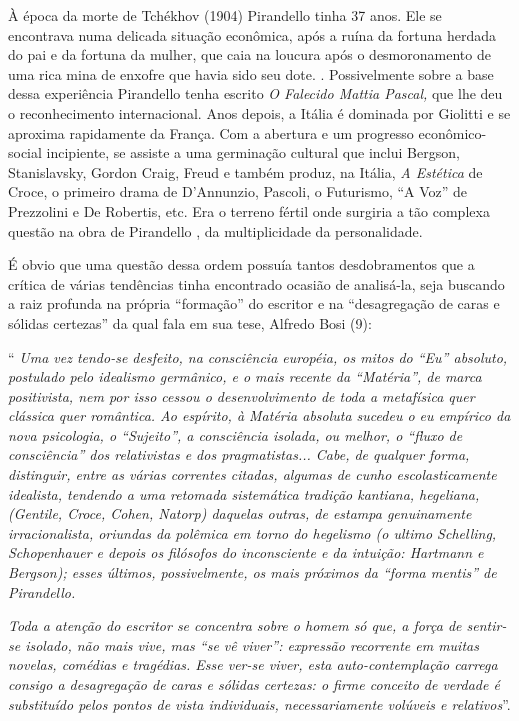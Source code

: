 À época da morte de Tchékhov (1904) Pirandello tinha 37 anos. Ele se
encontrava numa delicada situação econômica, após a ruína da fortuna
herdada do pai e da fortuna da mulher, que caia na loucura após o
desmoronamento de uma rica mina de enxofre que havia sido seu dote. .
Possivelmente sobre a base dessa experiência Pirandello tenha escrito
\emph{O Falecido Mattia Pascal,} que lhe deu o reconhecimento
internacional. Anos depois, a Itália é dominada por Giolitti e se
aproxima rapidamente da França. Com a abertura e um progresso
econômico-social incipiente, se assiste a uma germinação cultural que
inclui Bergson, Stanislavsky, Gordon Craig, Freud e também produz, na
Itália, \emph{A Estética} de Croce, o primeiro drama de D'Annunzio,
Pascoli, o Futurismo, ``A Voz'' de Prezzolini e De Robertis, etc. Era o
terreno fértil onde surgiria a tão complexa questão na obra de
Pirandello , da multiplicidade da personalidade.

É obvio que uma questão dessa ordem possuía tantos desdobramentos que a
crítica de várias tendências tinha encontrado ocasião de analisá-la,
seja buscando a raiz profunda na própria ``formação'' do escritor e na
``desagregação de caras e sólidas certezas'' da qual fala em sua tese,
Alfredo Bosi (9):

`` \emph{Uma vez tendo-se desfeito, na consciência européia, os mitos do
``Eu'' absoluto, postulado pelo idealismo germânico, e o mais recente da
``Matéria'', de marca positivista, nem por isso cessou o desenvolvimento
de toda a metafísica quer clássica quer romântica. Ao espírito, à
Matéria absoluta sucedeu o eu empírico da nova psicologia, o
``Sujeito'', a consciência isolada, ou melhor, o ``fluxo de
consciência'' dos relativistas e dos pragmatistas... Cabe, de qualquer
forma, distinguir, entre as várias correntes citadas, algumas de cunho
escolasticamente idealista, tendendo a uma retomada sistemática tradição
kantiana, hegeliana, (Gentile, Croce, Cohen, Natorp) daquelas outras, de
estampa genuinamente irracionalista, oriundas da polêmica em torno do
hegelismo (o ultimo Schelling, Schopenhauer e depois os filósofos do
inconsciente e da intuição: Hartmann e Bergson); esses últimos,
possivelmente, os mais próximos da ``forma mentis'' de Pirandello. }

\emph{Toda a atenção do escritor se concentra sobre o homem só que, a
força de sentir-se isolado, não mais vive, mas ``se vê viver'':
expressão recorrente em muitas novelas, comédias e tragédias. Esse
ver-se viver, esta auto-contemplação carrega consigo a desagregação de
caras e sólidas certezas: o firme conceito de verdade é substituído
pelos pontos de vista individuais, necessariamente volúveis e
relativos}''.

